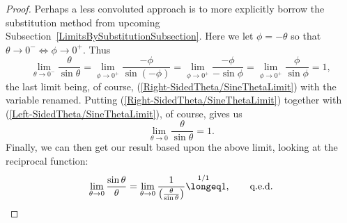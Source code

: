 \begin{proof}
Perhaps a less convoluted approach is to more explicitly
borrow the substitution method from upcoming
Subsection~\ref{LimitsBySubstitutionSubsection}.
Here we let $\phi=-\theta$ so that $\theta\to0^-\iff\phi\to0^+$.
Thus
\begin{equation}
\lim_{\theta\to0^-}\frac{\theta}{\sin\theta}
=\lim_{\phi\to0^+}\frac{-\phi}{\sin(-\phi)}
=\lim_{\phi\to0^+}\frac{-\phi}{-\sin\phi}
=\lim_{\phi\to0^+}\frac{\phi}{\sin\phi}=1,
\label{Left-SidedTheta/SineThetaLimit}
\end{equation}
the last limit being, of course, 
(\ref{Right-SidedTheta/SineThetaLimit}) with the variable renamed.
Putting (\ref{Right-SidedTheta/SineThetaLimit}) together with
(\ref{Left-SidedTheta/SineThetaLimit}), of course, gives us
\begin{equation}\lim_{\theta\to0}\frac{\theta}{\sin \theta}=1.
\label{Theta/SinThetaLimit}\end{equation}
Finally, we can then get our result based upon the above limit,
looking at the reciprocal function:
$$\lim_{\theta\to0}\frac{\sin \theta}{\theta}=\lim_{\theta\to0}
 \frac1{\left(\frac{\theta}{\sin \theta}\right)}
\overset{1/1}{\longeq}1,\qquad\text{q.e.d.}$$
\end{proof}



